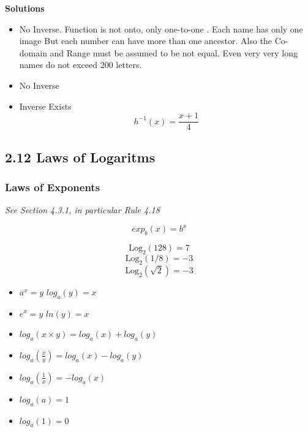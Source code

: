 \documentclass[12 pt]{article}
\begin{document}
\textbf{Solutions}
\begin{itemize}
\item No Inverse. Function is not onto, only one-to-one . Each name has only one image But each number can have more than one ancestor. Also the Co-domain and Range must be assumed to be not equal. Even very very long names do not exceed 200 letters.
\item No Inverse
\item Inverse Exists 
\[h^{-1}(x) = \frac{x+1}{4}  \]

\end{itemize}




\subsection*{2.12 Laws of Logaritms}

\subsubsection*{ Laws of Exponents}
\emph{See Section 4.3.1, in particular Rule 4.18}

\[ exp_b(x) = b^x \]


{\Large
\[\mbox{Log}_2(128) = 7\]
\[\mbox{Log}_2(1/8) = -3\]
\[\mbox{Log}_2(\sqrt{2}) = -3\]
}
\begin{itemize}
\item $a^x = y$  $log_a(y) = x$

\item $e^x = y$  $ln(y)=x$

\item $log_a(x\times y) = log_a(x) + log_a(y)$

\item $log_a(\frac{x}{y}) = log_a(x) - log_a(y)$

\item $log_a(\frac{1}{x}) = - log_a(x)$

\item $log_a(a) = 1$

\item $log_a(1) = 0$
\end{itemize}
\end{document}
